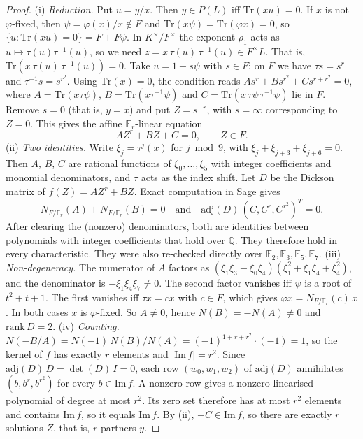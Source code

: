 \begin{proof}
(i) \emph{Reduction.} Put $u=y/x$. Then $y\in P(L)$ iff $\mathrm{Tr}(xu)=0$. If $x$ is not $\varphi$-fixed, then $\psi=\varphi(x)/x\notin F$ and
$\mathrm{Tr}(x\psi)=\mathrm{Tr}(\varphi x)=0$, so $\{u:\mathrm{Tr}(xu)=0\}=F+F\psi$.
In $K^\times/F^\times$ the exponent $\rho_1$ acts as $u\mapsto\tau(u)\tau^{-1}(u)$, so we need $z=x\,\tau(u)\,\tau^{-1}(u)\in F^\times L$. That is, $\mathrm{Tr}(x\,\tau(u)\,\tau^{-1}(u))=0$.
Take $u=1+s\psi$ with $s\in F$; on $F$ we have $\tau s=s^r$ and $\tau^{-1}s=s^{r^2}$. Using $\mathrm{Tr}(x)=0$, the condition reads $As^r+Bs^{r^2}+Cs^{r+r^2}=0$, where
$A=\mathrm{Tr}(x\tau\psi)$, $B=\mathrm{Tr}(x\tau^{-1}\psi)$ and $C=\mathrm{Tr}(x\,\tau\psi\,\tau^{-1}\psi)$ lie in $F$.
Remove $s=0$ (that is, $y=x$) and put $Z=s^{-r}$, with $s=\infty$ corresponding to $Z=0$. This gives the affine $\mathbb F_r$-linear equation
\[A Z^r+BZ+C=0,\qquad Z\in F.\]
(ii) \emph{Two identities.} Write $\xi_j=\tau^j(x)$ for $j\bmod 9$, with $\xi_j+\xi_{j+3}+\xi_{j+6}=0$. Then $A$, $B$, $C$ are rational functions of $\xi_0,\dots,\xi_5$
with integer coefficients and monomial denominators, and $\tau$ acts as the index shift. Let $D$ be the Dickson matrix of $f(Z)=AZ^r+BZ$. Exact computation in Sage gives
\[N_{F/\mathbb F_r}(A)+N_{F/\mathbb F_r}(B)=0\quad\text{and}\quad \mathrm{adj}(D)\,(C,C^r,C^{r^2})^{T}=0.\]
After clearing the (nonzero) denominators, both are identities between polynomials with integer coefficients that hold over $\mathbb Q$. They therefore hold in every characteristic.
They were also re-checked directly over $\mathbb F_2,\mathbb F_3,\mathbb F_5,\mathbb F_7$.
(iii) \emph{Non-degeneracy.} The numerator of $A$ factors as $(\xi_1\xi_3-\xi_0\xi_4)(\xi_1^2+\xi_1\xi_4+\xi_4^2)$, and the denominator is $-\xi_1\xi_4\xi_7\ne0$.
The second factor vanishes iff $\psi$ is a root of $t^2+t+1$. The first vanishes iff $\tau x=cx$ with $c\in F$, which gives $\varphi x=N_{F/\mathbb F_r}(c)\,x$.
In both cases $x$ is $\varphi$-fixed. So $A\ne0$, hence $N(B)=-N(A)\ne0$ and $\mathrm{rank}\,D=2$.
(iv) \emph{Counting.} $N(-B/A)=N(-1)\,N(B)/N(A)=(-1)^{1+r+r^2}\cdot(-1)=1$, so the kernel of $f$ has exactly $r$ elements and $|\mathrm{Im}\,f|=r^2$.
Since $\mathrm{adj}(D)\,D=\det(D)\,I=0$, each row $(w_0,w_1,w_2)$ of $\mathrm{adj}(D)$ annihilates $(b,b^r,b^{r^2})$ for every $b\in\mathrm{Im}\,f$.
A nonzero row gives a nonzero linearised polynomial of degree at most $r^2$. Its zero set therefore has at most $r^2$ elements and contains $\mathrm{Im}\,f$, so it equals $\mathrm{Im}\,f$.
By (ii), $-C\in\mathrm{Im}\,f$, so there are exactly $r$ solutions $Z$, that is, $r$ partners $y$.

\end{proof}
